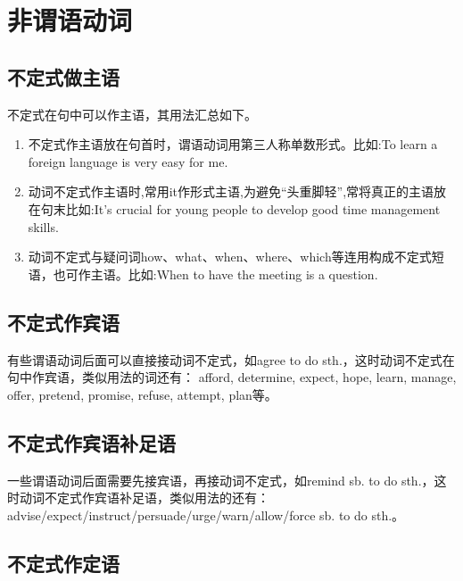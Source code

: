 
\section{非谓语动词}

\subsection{不定式做主语}

不定式在句中可以作主语，其用法汇总如下。
\begin{enumerate}
  \item 不定式作主语放在句首时，谓语动词用第三人称单数形式。比如:To learn a foreign language is very easy for me.
  \item 动词不定式作主语时,常用it作形式主语,为避免“头重脚轻”,常将真正的主语放在句末比如:It's crucial for young people to develop good time management skills.
  \item 动词不定式与疑问词how、what、when、where、which等连用构成不定式短语，也可作主语。比如:When to have the meeting is a question.
\end{enumerate}

\subsection{不定式作宾语}

有些谓语动词后面可以直接接动词不定式，如agree to do sth.，这时动词不定式在句中作宾语，类似用法的词还有： afford, determine, expect, hope, learn, manage, offer, pretend, promise, refuse, attempt, plan等。

\subsection{不定式作宾语补足语}

一些谓语动词后面需要先接宾语，再接动词不定式，如remind sb. to do sth.，这时动词不定式作宾语补足语，类似用法的还有： advise/expect/instruct/persuade/urge/warn/allow/force sb. to do sth.。

\subsection{不定式作定语}

